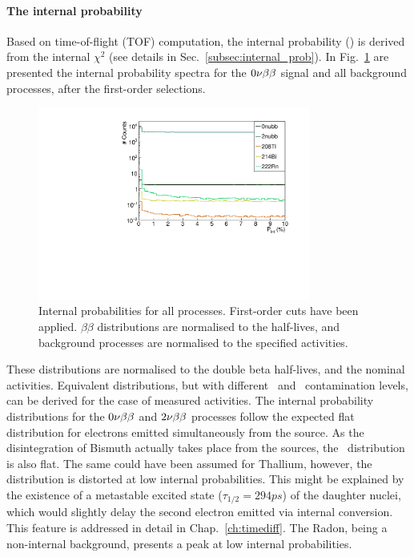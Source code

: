 \paragraph{The internal probability}
Based on time-of-flight (TOF) computation, the internal probability (\Pint) is derived from the internal $\chi^{2}$ (see details in Sec.~\ref{subsec:internal_prob}).
In Fig.~\ref{fig:Pint} are presented the internal probability spectra for the $0\nu\beta\beta$ signal and all background processes, after the first-order selections.
\begin{figure}[h]
  \centering
  \includegraphics[width=0.8\textwidth]{Sensitivity/fig_sensitivity/InternalProbability.pdf}
  \caption{Internal probabilities for all processes.
    First-order cuts have been applied.
    $\beta\beta$ distributions are normalised to the half-lives, and background processes are normalised to the specified activities.
    \label{fig:Pint}}
\end{figure}
These distributions are normalised to the double beta half-lives, and the nominal activities.
Equivalent distributions, but with different \Bi\ and \Tl\ contamination levels, can be derived for the case of measured activities.
The internal probability distributions for the $0\nu\beta\beta$ and $2\nu\beta\beta$ processes follow the expected flat distribution for electrons emitted simultaneously from the source.
As the disintegration of Bismuth actually takes place from the sources, the \Bi\ distribution is also flat.
The same could have been assumed for Thallium, however, the distribution is distorted at low internal probabilities.
This might be explained by the existence of a metastable excited state ($\tau_{1/2} = 294 ps$) of the daughter nuclei, which would slightly delay the second electron emitted via internal conversion.
This feature is addressed in detail in Chap.~\ref{ch:timediff}.
The Radon, being a non-internal background, presents a peak at low internal probabilities.

